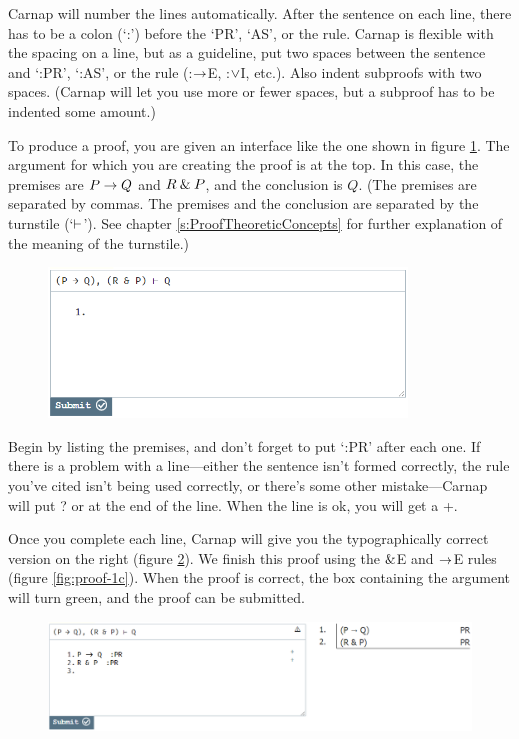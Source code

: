 \noindent Carnap will number the lines automatically. After the sentence on each line, there has to be a colon (`:') before the `PR', `AS', or the rule. Carnap is flexible with the spacing on a line, but as a guideline, put two spaces between the sentence and `:PR', `:AS', or the rule (:$\rightarrow$E, :$\vee$I, etc.). Also indent subproofs with two spaces. (Carnap will let you use more or fewer spaces, but a subproof has to be indented some amount.)

To produce a proof, you are given an interface like the one shown in figure \ref{fig:proof-1a}. The argument for which you are creating the proof is at the top. In this case, the premises are $P \rightarrow Q$ and $R \mathbin{\&} P$, and the conclusion is $Q$. (The premises are separated by commas. The premises and the conclusion are separated by the turnstile (`$\vdash$'). See chapter \ref{s:ProofTheoreticConcepts} for further explanation of the meaning of the turnstile.)

\begin{figure}
\centering
\includegraphics[height=4cm]{textbook--1a.PNG}
\caption{}
\label{fig:proof-1a}
\end{figure}

Begin by listing the premises, and don't forget to put `:PR' after each one. If there is a problem with a line---either the sentence isn't formed correctly, the rule you've cited isn't being used correctly, or there's some other mistake---Carnap will put \textsf{?} or {\selectfont{}\relax}  at the end of the line. When the line is ok, you will get a +.

Once you complete each line, Carnap will give you the typographically correct version on the right (figure \ref{fig:proof-1b}). We finish this proof using the $\mathbin{\&}$E and $\rightarrow$E rules (figure \ref{fig:proof-1c}). When the proof is correct, the box containing the argument will turn green, and the proof can be submitted. 

\begin{figure}[h]
\includegraphics[width=13cm]{textbook--1b.PNG}
\caption{}
\label{fig:proof-1b}
\end{figure}

